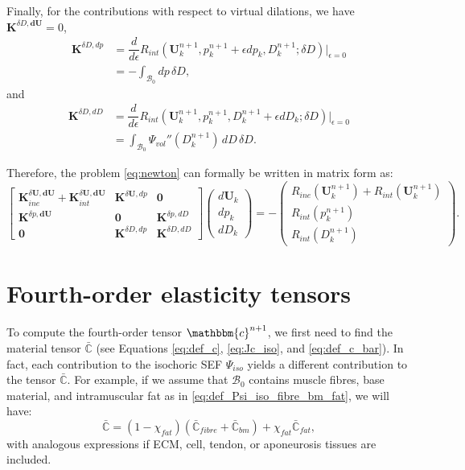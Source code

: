 \documentclass{sfuthesis}
\numberwithin{equation}{section}
\numberwithin{figure}{chapter}
\numberwithin{table}{chapter}
\theoremstyle{definition}
\def\*#1{{\mathbf{#1}}} %
\newcommand{\der}[2]{\dfrac{d #1}{d #2}}
\newcommand{\B}{\mathcal{B}}
\newcommand{\C}{\mathbb{C}}
\renewcommand{\c}{\mathbbm{c}}
\begin{document}
Finally, for the contributions with respect to virtual dilations, we have $\*K^{\delta D, \*d\*U} = 0$, 
\begin{equation}
\begin{aligned}
\*K^{\delta D, dp} &= \der{}{\epsilon} R_{int}(\*U^{n+1}_k, p^{n+1}_k + \epsilon dp_k, D^{n+1}_k; \delta D) \Big|_{\epsilon=0}  \\
&= -\int_{\B_0}  dp \, \delta D,
\end{aligned}
\end{equation}
and
\begin{equation}
\begin{aligned}
\*K^{\delta D, dD} &= \der{}{\epsilon}R_{int}(\*U^{n+1}_k, p^{n+1}_k, D^{n+1}_k + \epsilon dD_k ; \delta D) \Big|_{\epsilon=0} \\
&= \int_{\B_0} \Psi_{vol}''(D^{n+1}_k) \, dD \, \delta D.
\end{aligned}
\end{equation}

Therefore, the problem \eqref{eq:newton} can formally be written in matrix form as:
\begin{equation} \label{eq:LF_linear_system}
    \left[\begin{matrix}
    \*K_{ine}^{\delta \*U, \*d\*U} + \*K_{int}^{\delta \*U, \*d\*U} & \*K^{\delta \*U, dp} & \*0 \\
    \*K^{\delta p, \*d\*U} & \*0 & \*K^{\delta p, dD} \\
    \*0 & \*K^{\delta D, dp} & \*K^{\delta D, dD}
    \end{matrix}\right] 
    \left( \begin{matrix}
      d\*U_k \\ dp_k \\ dD_k
    \end{matrix}\right) = -
    \left(\begin{matrix}
      R_{ine}(\*U^{n+1}_k) + R_{int}(\*U^{n+1}_k) \\
      R_{int}(p^{n+1}_k)\\
      R_{int}(D^{n+1}_k)
    \end{matrix}\right).
\end{equation}

\section{Fourth-order elasticity tensors} \label{sec:elasticity_tensors}

To compute the fourth-order tensor $\c^{n+1}$, we first need to find the material tensor $\bar{\C}$ (see Equations \eqref{eq:def_c}, \eqref{eq:Jc_iso}, and \eqref{eq:def_c_bar}). In fact, each contribution to the isochoric SEF $\Psi_{iso}$ yields a different contribution to the tensor $\bar{\C}$. For example, if we assume that $\B_0$ contains muscle fibres, base material, and intramuscular fat as in \eqref{eq:def_Psi_iso_fibre_bm_fat}, we will have:
\begin{equation}
    \bar{\C} = (1-\chi_{fat})(\bar{\C}_{fibre} + \bar{\C}_{bm}) + \chi_{fat} \bar{\C}_{fat},
\end{equation}
with analogous expressions if ECM, cell, tendon, or aponeurosis tissues are included. 
\end{document}
